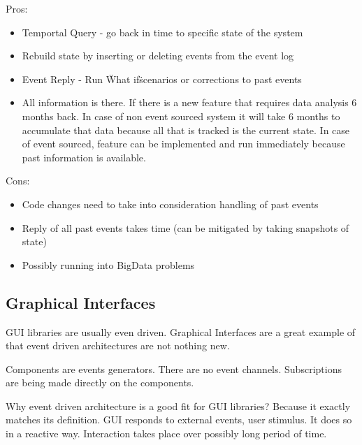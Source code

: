 \documentclass[12pt, a4paper]{article}
\begin{document}
Pros:
\begin{itemize}
  \item Temportal Query - go back in time to specific state of the system
  \item Rebuild state by inserting or deleting events from the event log
  \item Event Reply - Run \"What if\" scenarios or corrections to past events
  \item All information is there. If there is a new feature that requires data analysis 6 months back. In case of non event sourced system it will take 6 months to accumulate that data because all that is tracked is the current state. In case of event sourced, feature can be implemented and run immediately because past information is available.
\end{itemize}

Cons:
\begin{itemize}
  \item Code changes need to take into consideration handling of past events
  \item Reply of all past events takes time (can be mitigated by taking snapshots of state)
  \item Possibly running into BigData problems
\end{itemize}

\subsection{Graphical Interfaces}
GUI libraries are usually even driven. Graphical Interfaces are a great example of that event driven architectures are not nothing new. 

Components are events generators. There are no event channels. Subscriptions are being made directly on the components.

Why event driven architecture is a good fit for GUI libraries? Because it exactly matches its definition. GUI responds to external events, user stimulus. It does so in a reactive way. Interaction takes place over possibly long period of time.


  

\nocite{*}


\end{document}
